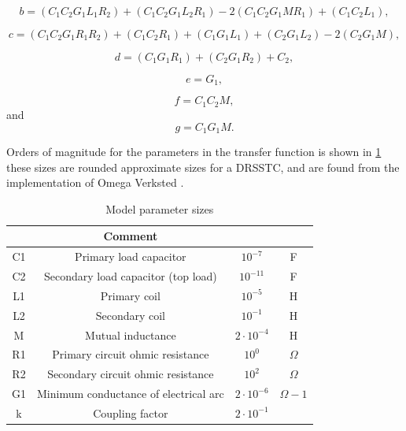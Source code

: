 \begin{equation} \label{eq:5_2}
    b = (C_1 C_2 G_1 L_1 R_2)+(C_1 C_2 G_1 L_2 R_1)-2 (C_1 C_2 G_1 M R_1)+(C_1 C_2 L_1),
\end{equation}

\begin{equation} \label{eq:5_3}
    c = (C_1 C_2 G_1 R_1 R_2)+(C_1 C_2 R_1)+(C_1 G_1 L_1)+(C_2 G_1 L_2)-2 (C_2 G_1 M),
\end{equation}

\begin{equation} \label{eq:5_4}
    d = (C_1 G_1 R_1)+(C_2 G_1 R_2)+C_2,
\end{equation}

\begin{equation} \label{eq:5_5}
    e = G_1,
\end{equation}

\begin{equation} \label{eq:5_6}
    f = C_1 C_2 M,
\end{equation}
and
\begin{equation} \label{eq:5_7}
    g = C_1 G_1 M.
\end{equation}

Orders of magnitude for the parameters in the transfer function is shown in \cref{tab:mod_params} these sizes are rounded approximate sizes for a DRSSTC, and are found from the implementation of Omega Verksted \citep{prosjektoppgave}.

\begin{table}[H]
    \centering
    \begin{tabular}{c|c|c|c}
         & Comment &  &\\ \hline
        C1 & Primary load capacitor                 & $10^{-7}$ & F \\
        C2 & Secondary load capacitor (top load)    & $10^{-11}$& F \\
        L1 & Primary coil                           & $10^{-5}$ & H \\
        L2 & Secondary coil                         & $10^{-1}$ & H \\
        M  & Mutual inductance                      & $2 \cdot 10^{-4}$ & H \\
        R1 & Primary circuit ohmic resistance       & $10^{0}$  & $\Omega$ \\
        R2 & Secondary circuit ohmic resistance     & $10^{2}$  & $\Omega$ \\
        G1 & Minimum conductance of electrical arc  & $2 \cdot 10^{-6}$  & ${\Omega}-1$ \\
        k  & Coupling factor                        & $2 \cdot 10^{-1}$ & 
    \end{tabular}
    \caption{Model parameter sizes}
    \label{tab:mod_params}
\end{table}

